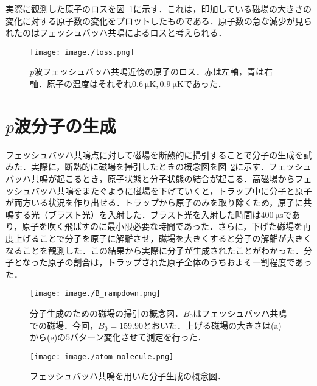 \documentclass[11pt,a4j,notitlepage]{jreport}
\newcommand{\fig}[1]{図~\ref{#1}}	%
\begin{document}
実際に観測した原子のロスを\fig{fig4.2.1}に示す．これは，印加している磁場の大きさの変化に対する原子数の変化をプロットしたものである．原子数の急な減少が見られたのはフェッシュバッハ共鳴によるロスと考えられる．
\begin{figure}[H]
	\centering
		\texttt{[image: image./loss.png]}
	\caption{$p$波フェッシュバッハ共鳴近傍の原子のロス．赤は左軸，青は右軸．原子の温度はそれぞれ$0.6 \  \mathrm{\mu K}, 0.9 \  \mathrm{\mu K}$であった．}
	\label{fig4.2.1}
\end{figure}

\section{$p$波分子の生成}
フェッシュバッハ共鳴点に対して磁場を断熱的に掃引することで分子の生成を試みた．実際に，断熱的に磁場を掃引したときの概念図を\fig{fig4.3.1}に示す．フェッシュバッハ共鳴が起こるとき，原子状態と分子状態の結合が起こる．高磁場からフェッシュバッハ共鳴をまたぐように磁場を下げていくと，トラップ中に分子と原子が両方いる状況を作り出せる．トラップから原子のみを取り除くため，原子に共鳴する光（ブラスト光）を入射した．ブラスト光を入射した時間は$400\ \mathrm{\mu s}$であり，原子を吹く飛ばすのに最小限必要な時間であった．さらに，下げた磁場を再度上げることで分子を原子に解離させ，磁場を大きくすると分子の解離が大きくなることを観測した．この結果から実際に分子が生成されたことがわかった．分子となった原子の割合は，トラップされた原子全体のうちおよそ一割程度であった．
\begin{figure}[H]
	\centering
		\texttt{[image: image./B\_rampdown.png]}
	\caption{分子生成のための磁場の掃引の概念図．$B_0$はフェッシュバッハ共鳴での磁場．今回，$B_0=159.90$とおいた．上げる磁場の大きさは(a)から(e)の$5$パターン変化させて測定を行った．}
	\label{fig4.3.1}
\end{figure}
\begin{figure}[H]
	\centering
		\texttt{[image: image./atom-molecule.png]}
	\caption{フェッシュバッハ共鳴を用いた分子生成の概念図．}
	\label{fig4.3.2}
\end{figure}
\end{document}
